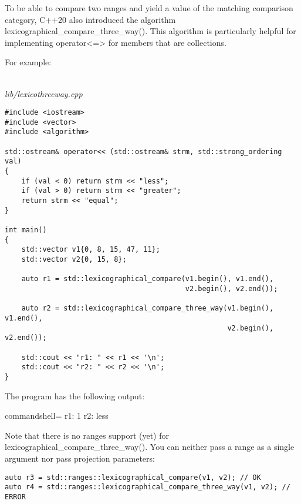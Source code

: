 To be able to compare two ranges and yield a value of the matching comparison category, C++20 also introduced the algorithm lexicographical\_compare\_three\_way(). This algorithm is particularly helpful for implementing operator<=> for members that are collections.

For example:

\noindent
\hspace*{\fill} \\ %
\textit{lib/lexicothreeway.cpp}

\begin{lstlisting}[style=styleCXX]
#include <iostream>
#include <vector>
#include <algorithm>

std::ostream& operator<< (std::ostream& strm, std::strong_ordering val)
{
	if (val < 0) return strm << "less";
	if (val > 0) return strm << "greater";
	return strm << "equal";
}

int main()
{
	std::vector v1{0, 8, 15, 47, 11};
	std::vector v2{0, 15, 8};
	
	auto r1 = std::lexicographical_compare(v1.begin(), v1.end(),
										   v2.begin(), v2.end());
										   
	auto r2 = std::lexicographical_compare_three_way(v1.begin(), v1.end(),
													 v2.begin(), v2.end());
													 
	std::cout << "r1: " << r1 << '\n';
	std::cout << "r2: " << r2 << '\n';
}
\end{lstlisting}

The program has the following output:

\begin{tcblisting}{commandshell={}}
r1: 1
r2: less
\end{tcblisting}

Note that there is no ranges support (yet) for lexicographical\_compare\_three\_way(). You can neither pass a range as a single argument nor pass projection parameters:

\begin{lstlisting}[style=styleCXX]
auto r3 = std::ranges::lexicographical_compare(v1, v2); // OK
auto r4 = std::ranges::lexicographical_compare_three_way(v1, v2); // ERROR
\end{lstlisting}




